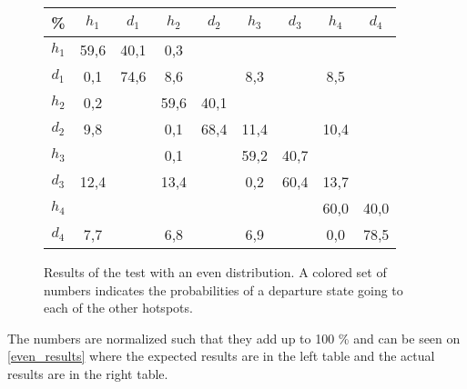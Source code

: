 \begin{figure}[p]
	\centering
\begin{tabular}{|c | c c c c c c c c|}
\hline
\% &      $ h_1 $ & $ d_1 $ & $ h_2 $ & $ d_2 $ & $ h_3 $ & $ d_3 $ & $ h_4 $ & $ d_4 $\\
 \hline
$ h_1 $ & 59,6 &  40,1 & 0,3 &   &   &   &   &  \\
$ d_1 $ & 0,1 &  74,6 &  { \color{red} 8,6} &   &   {\color{red}8,3} &   &  {\color{red} 8,5} &  \\
$ h_2 $ & 0,2 &   &  59,6 &  40,1 &   &   &   &  \\
$ d_2 $ & {\color{blue}9,8} &   &   0,1 &  68,4 &  {\color{blue}11,4} &   &  {\color{blue}10,4} &  \\
$ h_3 $ & &   &   0,1 &   &  59,2 &  40,7 &   &  \\
$ d_3 $ & {\color{orange}12,4} &   &  {\color{orange}13,4} &   &   0,2 &  60,4 &  {\color{orange}13,7} &  \\
$ h_4 $ & &   &   &   &   &   &  60,0 &  40,0\\
$ d_4 $ & {\color{purple}7,7} &   &   {\color{purple}6,8} &   &   {\color{purple}6,9} &   &   0,0 &  78,5\\
\hline
\end{tabular}
\caption{Results of the test with an even distribution. A colored set of numbers indicates the probabilities of a departure state going to each of the other hotspots.}\label{test_even}
\end{figure}

The numbers are normalized such that they add up to 100 \% and can be seen on \cref{even_results} where the expected results are in the left table and the actual results are in the right table.

